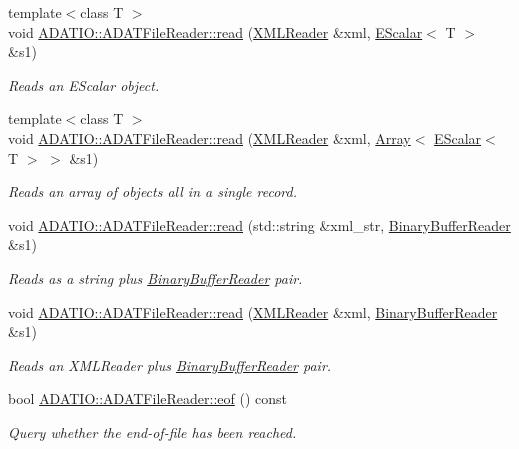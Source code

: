\begin{DoxyCompactItemize}
{\footnotesize template$<$class T $>$ }\\void \mbox{\hyperlink{group__qio_gac92ce1b0fee7c00b8a7dc988f3d4906e}{A\+D\+A\+T\+I\+O\+::\+A\+D\+A\+T\+File\+Reader\+::read}} (\mbox{\hyperlink{classADATXML_1_1XMLReader}{X\+M\+L\+Reader}} \&xml, \mbox{\hyperlink{classENSEM_1_1EScalar}{E\+Scalar}}$<$ T $>$ \&s1)
\begin{DoxyCompactList}\small\item\em Reads an E\+Scalar object. \end{DoxyCompactList}\item 
{\footnotesize template$<$class T $>$ }\\void \mbox{\hyperlink{group__qio_ga32969d6bfdfe9da2912e92d1f0871c20}{A\+D\+A\+T\+I\+O\+::\+A\+D\+A\+T\+File\+Reader\+::read}} (\mbox{\hyperlink{classADATXML_1_1XMLReader}{X\+M\+L\+Reader}} \&xml, \mbox{\hyperlink{classXMLArray_1_1Array}{Array}}$<$ \mbox{\hyperlink{classENSEM_1_1EScalar}{E\+Scalar}}$<$ T $>$ $>$ \&s1)
\begin{DoxyCompactList}\small\item\em Reads an array of objects all in a single record. \end{DoxyCompactList}\item 
void \mbox{\hyperlink{group__qio_ga2179348a566e0224ed2122acfabf8bc9}{A\+D\+A\+T\+I\+O\+::\+A\+D\+A\+T\+File\+Reader\+::read}} (std\+::string \&xml\+\_\+str, \mbox{\hyperlink{classADATIO_1_1BinaryBufferReader}{Binary\+Buffer\+Reader}} \&s1)
\begin{DoxyCompactList}\small\item\em Reads as a string plus \mbox{\hyperlink{classADATIO_1_1BinaryBufferReader}{Binary\+Buffer\+Reader}} pair. \end{DoxyCompactList}\item 
void \mbox{\hyperlink{group__qio_gadf1e0b4405e14798a0610efd8774f8d0}{A\+D\+A\+T\+I\+O\+::\+A\+D\+A\+T\+File\+Reader\+::read}} (\mbox{\hyperlink{classADATXML_1_1XMLReader}{X\+M\+L\+Reader}} \&xml, \mbox{\hyperlink{classADATIO_1_1BinaryBufferReader}{Binary\+Buffer\+Reader}} \&s1)
\begin{DoxyCompactList}\small\item\em Reads an X\+M\+L\+Reader plus \mbox{\hyperlink{classADATIO_1_1BinaryBufferReader}{Binary\+Buffer\+Reader}} pair. \end{DoxyCompactList}\item 
bool \mbox{\hyperlink{group__qio_ga22337f3cfe1b2ecd1ead8d2755a1f9ca}{A\+D\+A\+T\+I\+O\+::\+A\+D\+A\+T\+File\+Reader\+::eof}} () const
\begin{DoxyCompactList}\small\item\em Query whether the end-\/of-\/file has been reached. \end{DoxyCompactList}\item 

\end{DoxyCompactItemize}
